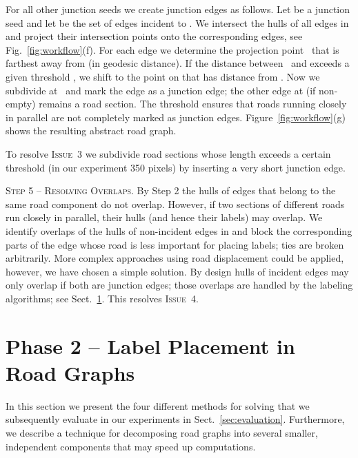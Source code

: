 \documentclass[a4paper,11pt]{article}
\newcommand{\ILong}{\textsc{Issue~3}\xspace}
\newcommand{\IFatLabels}{\textsc{Issue~4}\xspace}
\begin{document}
 For all other junction seeds we create junction edges as follows. Let  be a junction seed and let  be the set of edges incident to . We intersect the hulls of all  edges in  and project their intersection points onto the corresponding edges, see Fig.~\ref{fig:workflow}(f). For each edge  we determine the projection point~ that is farthest away from  (in geodesic distance). If the distance between~ and  exceeds a given threshold , we shift  to the point on  that has distance  from . Now we subdivide  at~ and mark the edge  as a junction edge; the other edge at  (if non-empty) remains a road section. The threshold  ensures that roads running closely in parallel are not completely marked as junction edges. Figure~\ref{fig:workflow}(g) shows the resulting abstract road graph. 


 
 
 
To resolve \ILong we
 subdivide road sections whose length exceeds a certain threshold (in
 our experiment 350 pixels) by inserting a very short junction edge.


\textsc{Step 5 -- Resolving Overlaps.} By Step 2 the
hulls of edges that belong to the same road component
do not overlap. However, if two sections of different roads run
closely in parallel, their hulls (and hence their labels) may overlap. We identify overlaps of
the hulls of non-incident edges in  and block the corresponding
parts of the edge whose road is less
important for placing labels; ties are broken arbitrarily. More complex approaches
using road displacement could be applied, however, we have chosen a simple solution.  By design hulls
of incident edges may only overlap if both are junction edges; those
overlaps are handled by the labeling algorithms; see
Sect.~\ref{sec:labeling}.  This resolves \IFatLabels.








\section{Phase 2 -- Label Placement in Road
  Graphs}\label{sec:labeling} 
  
  In this section we present the four different methods for solving \MaxTotalCovering that we subsequently evaluate in our experiments in Sect.~\ref{sec:evaluation}. Furthermore, we describe a technique for decomposing road graphs into several smaller, independent components that may speed up computations.
\end{document}
